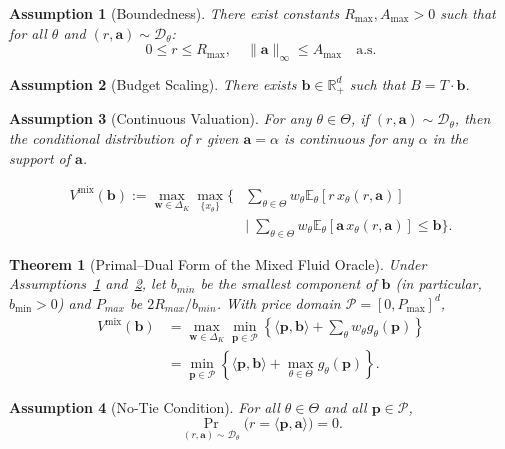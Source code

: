 \documentclass[10pt,a4paper]{amsart}
\newtheorem{assumption}{Assumption}
\newtheorem{theorem}{Theorem}
\newcommand{\E}{\mathbb{E}}
\newcommand{\ba}{\mathbf{a}}
\newcommand{\bb}{\mathbf{b}}
\newcommand{\bp}{\mathbf{p}}
\newcommand{\bw}{\mathbf{w}}
\newcommand{\cD}{\mathcal{D}}
\newcommand{\cP}{\mathcal{P}}
\begin{document}
\begin{assumption}[Boundedness]
\label{assump:bounded}
There exist constants $R_{\max}, A_{\max} > 0$ such that for all $\theta$ and $(r, \ba) \sim \cD_\theta$:
\[
0 \le r \le R_{\max}, \quad \|\ba\|_\infty \le A_{\max} \quad \text{a.s.}
\]
\end{assumption}

\begin{assumption}[Budget Scaling]
\label{assump:budget-scaling}
There exists $\bb\in \mathbb{R}_+^d$ such that $B=T\cdot \bb$.
\end{assumption}

\begin{assumption}[Continuous Valuation]
\label{assump:contivalue}
For any $\theta\in\Theta$, if $(r,\ba)\sim \cD_{\theta}$, then the conditional distribution of $r$ given $\ba=\alpha$ is continuous for any $\alpha$ in the support of $\ba$.
\end{assumption}

\begin{equation}
\label{eq:mix-primal}
\begin{split}
V^{\mathrm{mix}}(\bb) := \max_{\bw \in \Delta_K} \max_{\{x_\theta\}} \Big\{ & \sum_{\theta \in \Theta} w_\theta \E_\theta[r\,x_\theta(r, \ba)] \\
& \Big|\; \sum_{\theta \in \Theta} w_\theta \E_\theta[\ba\,x_\theta(r, \ba)] \le \bb \Big\}.
\end{split}
\end{equation}

\begin{theorem}[Primal--Dual Form of the Mixed Fluid Oracle]
\label{thm:mix-dual}
Under Assumptions~\ref{assump:bounded} and~\ref{assump:budget-scaling}, let $b_{min}$ be the smallest component of $\bb$ (in particular, $b_{\min} > 0$) and $P_{max}$ be $2R_{max}/b_{min}$. With price domain $\cP = [0, P_{\max}]^d$,
\begin{equation}
\label{eq:mix-dual}
\begin{split}
V^{\mathrm{mix}}(\bb) &= \max_{\bw \in \Delta_K} \min_{\bp \in \cP} \left\{ \langle \bp, \bb \rangle + \sum_{\theta} w_\theta g_\theta(\bp) \right\} \\
&= \min_{\bp \in \cP} \left\{ \langle \bp, \bb \rangle + \max_{\theta \in \Theta} g_\theta(\bp) \right\}.
\end{split}
\end{equation}
\end{theorem}

\begin{assumption}[No-Tie Condition]
\label{assump:no-ties}
For all $\theta \in \Theta$ and all $\bp \in \cP$,
\[
\Pr_{(r,\ba) \sim \cD_\theta}\big(r = \langle \bp, \ba \rangle\big) = 0.
\]
\end{assumption}
\end{document}
